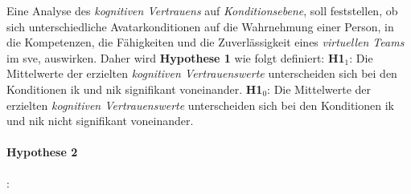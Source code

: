 \documentclass[a4paper,11pt]{article}%
\renewcommand{\\}{\vspace*{0.5\baselineskip} \newline}
\begin{document}
Eine Analyse des \textit{kognitiven Vertrauens} auf \textit{Konditionsebene}, soll feststellen, ob sich unterschiedliche Avatarkonditionen auf die Wahrnehmung einer Person, in die Kompetenzen, die Fähigkeiten und die Zuverlässigkeit eines \textit{virtuellen Teams} im \ac{sve}, auswirken.
Daher wird \textbf{Hypothese 1} wie folgt definiert:\\
\textbf{H1$_{1}$}: Die Mittelwerte der erzielten \textit{kognitiven Vertrauenswerte} unterscheiden sich bei den Konditionen \ac{ik} und \ac{nik} signifikant voneinander. \newline
\textbf{H1$_{0}$}: Die Mittelwerte der erzielten \textit{kognitiven Vertrauenswerte} unterscheiden sich bei den Konditionen \ac{ik} und \ac{nik} nicht signifikant voneinander.


\paragraph{Hypothese 2}:
\end{document}
